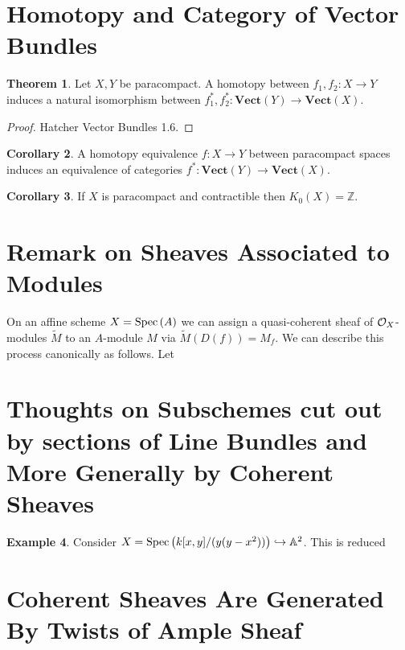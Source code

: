 \documentclass[12pt]{extarticle}
\newcommand{\Z}{\mathbb{Z}}
\theoremstyle{definition}
\newtheorem{theorem}{Theorem}[section]
\newtheorem{example}[theorem]{Example}
\newtheorem{corollary}[theorem]{Corollary}
\newcommand{\embed}{\hookrightarrow}
\newcommand{\A}{\mathbb{A}}
\begin{document}
\section{Homotopy and Category of Vector Bundles}

\newcommand{\Vect}[1]{\mathbf{Vect}\left(#1 \right)}

\begin{theorem}
Let $X, Y$ be paracompact. A homotopy between $f_1, f_2 : X \to Y$ induces a natural isomorphism between $f_1^*, f_2^* : \Vect{Y} \to \Vect{X}$. 
\end{theorem}

\begin{proof}
Hatcher Vector Bundles 1.6.
\end{proof}

\begin{corollary}
A homotopy equivalence $f : X \to Y$ between paracompact spaces induces an equivalence of categories $f^* : \Vect{Y} \to \Vect{X}$. 
\end{corollary}

\begin{corollary}
If $X$ is paracompact and contractible then $K_0(X) = \Z$. 
\end{corollary}

\section{Remark on Sheaves Associated to Modules}

On an affine scheme $X = \mathrm{Spec}\left(A\right)$ we can assign a quasi-coherent sheaf of $\mathcal{O}_{X}$-modules $\widetilde{M}$ to an $A$-module $M$ via $\widetilde{M}(D(f)) = M_f$. We can describe this process canonically as follows. Let 


\section{Thoughts on Subschemes cut out by sections of Line Bundles and More Generally by Coherent Sheaves}

\begin{example}
Consider $X = \Spec{k[x, y] / (y(y - x^2))} \embed \A^2$. This is reduced 
\end{example}


\section{Coherent Sheaves Are Generated By Twists of Ample Sheaf}
\end{document}

